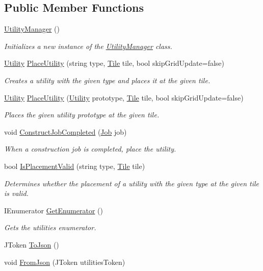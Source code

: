 \subsection*{Public Member Functions}
\begin{DoxyCompactItemize}
\item 
\hyperlink{class_utility_manager_a4ee75d8bf97b9cdda04c8f6b5df9f55d}{Utility\+Manager} ()
\begin{DoxyCompactList}\small\item\em Initializes a new instance of the \hyperlink{class_utility_manager}{Utility\+Manager} class. \end{DoxyCompactList}\item 
\hyperlink{class_utility}{Utility} \hyperlink{class_utility_manager_aa0f600f8e00d39369a9c739b3a7d5c4e}{Place\+Utility} (string type, \hyperlink{class_tile}{Tile} tile, bool skip\+Grid\+Update=false)
\begin{DoxyCompactList}\small\item\em Creates a utility with the given type and places it at the given tile. \end{DoxyCompactList}\item 
\hyperlink{class_utility}{Utility} \hyperlink{class_utility_manager_aebfe52cfaf40c55421ae5fbc2ed0c130}{Place\+Utility} (\hyperlink{class_utility}{Utility} prototype, \hyperlink{class_tile}{Tile} tile, bool skip\+Grid\+Update=false)
\begin{DoxyCompactList}\small\item\em Places the given utility prototype at the given tile. \end{DoxyCompactList}\item 
void \hyperlink{class_utility_manager_a6b0d4a143b6944fc6f539f1762ede9be}{Construct\+Job\+Completed} (\hyperlink{class_job}{Job} job)
\begin{DoxyCompactList}\small\item\em When a construction job is completed, place the utility. \end{DoxyCompactList}\item 
bool \hyperlink{class_utility_manager_a617ae33d8a98a4c831036acfb91ccb8a}{Is\+Placement\+Valid} (string type, \hyperlink{class_tile}{Tile} tile)
\begin{DoxyCompactList}\small\item\em Determines whether the placement of a utility with the given type at the given tile is valid. \end{DoxyCompactList}\item 
I\+Enumerator \hyperlink{class_utility_manager_a38b4a23270b7a6955e1bf0c66037dd1b}{Get\+Enumerator} ()
\begin{DoxyCompactList}\small\item\em Gets the utilities enumerator. \end{DoxyCompactList}\item 
J\+Token \hyperlink{class_utility_manager_a78831152225d0b5e5531b9d8152ebbc4}{To\+Json} ()
\item 
void \hyperlink{class_utility_manager_aa5d5b53d6e90eb7463202e01e72ab5f1}{From\+Json} (J\+Token utilities\+Token)
\end{DoxyCompactItemize}
